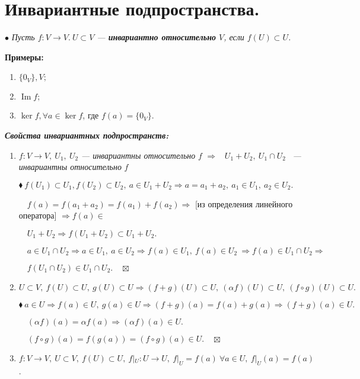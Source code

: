 \documentclass[a4paper, 12pt]{report}
\begin{document}
	\section{Инвариантные подпространства.}
	$\bullet$ \textit{Пусть $f:{V \rightarrow V. \ U \subset V }$ --- \textbf{инвариантно относительно} $V$, если $f(U) \subset U$.}
	\par\bigskip
	\textbf{Примеры:}
	\begin{enumerate}
		\item $\{0_V\}, V;$
		\item $\mathop{\text{Im}}f;$
		\item $\ker f, \forall a \in \ker f$, где $f(a) = \{0_V\}.$
	\end{enumerate}
	\textit{ \textbf{Свойства инвариантных подпространств:}}
	\begin{enumerate}
		\item $f:{V \rightarrow V}, \ U_1, \ U_2$ \textit{--- инвариантны относительно} $f$ $\Rightarrow$ \ $U_1 + U_2,\ U_1 \cap U_2$ \ \textit{--- инвариантны относительно} $f$
		
		$\blacklozenge \ f(U_1) \subset U_1, f(U_2) \subset U_2, \ a \in  U_1 + U_2 \Rightarrow a = a_1 + a_2,\ a_1 \in U_1, \ a_2 \in U_2.$
		
		$\quad f(a) = f(a_1 + a_2) = f(a_1) + f(a_2) \Rightarrow$ [из определения линейного оператора] $\Rightarrow f(a) \in$ 
		
		$\quad U_1 + U_2 \Rightarrow f(U_1 + U_2) \subset U_1 + U_2.$
		
		$\quad a \in U_1 \cap U_2 \Rightarrow a\in U_1,\ a \in U_2 \Rightarrow f(a) \in U_1, \ f(a) \in U_2 \ \Rightarrow f(a) \in U_1 \cap U_2 \Rightarrow $
		
		$\quad f(U_1 \cap U_2)  \in U_1 \cap U_2.  \quad \boxtimes$
		
		\item $U \subset V,\   f(U) \subset U,\  g(U) \subset U \Rightarrow (f + g)(U) \subset U,\  (\alpha f)(U) \subset U,\  (f \circ g)(U) \subset U.$
		
		$\blacklozenge \ a \in U \Rightarrow f(a) \in U, \ g(a) \in U \Rightarrow (f + g)(a) = f(a) + g(a) \Rightarrow (f + g)(a) \in U.$
		
		$\quad (\alpha f)(a) = \alpha f(a) \Rightarrow (\alpha f)(a) \in U.$
		
		$\quad  (f \circ g)(a) = f(g(a)) = (f \circ g)(a) \in U. \quad \boxtimes$
		
		\item  $f: V \rightarrow V,\  U \subset V, \ f(U) \subset U,\ f|_U : U \rightarrow U,\  f|_U = f(a)\  \forall a \in U,\  f|_U(a) = f(a)$.
		
	\end{enumerate}
	
\end{document}
